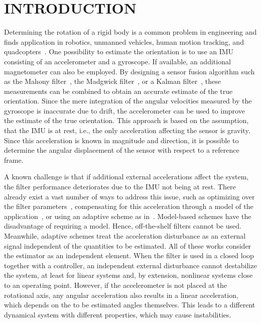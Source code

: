 
\section{INTRODUCTION}
Determining the rotation of a rigid body is a common problem in engineering and finds application in robotics, unmanned vehicles, human motion tracking, and quadcopters~\cite{Ludwig2018a, Nazarahari2021}.
One possibility to estimate the orientation is to use an \ac{IMU} consisting of an accelerometer and a gyroscope.
If available, an additional magnetometer can also be employed.
By designing a sensor fusion algorithm such as the Mahony filter~\cite{Mahony2008}, the Madgwick filter~\cite{Madgwick2011}, or a Kalman filter~\cite{Ludwig2018a}, these measurements can be combined to obtain an accurate estimate of the true orientation.
Since the mere integration of the angular velocities measured by the gyroscope is inaccurate due to drift, the accelerometer can be used to improve the estimate of the true orientation.
This approach is based on the assumption, that the \ac{IMU} is at rest, i.e., the only acceleration affecting the sensor is gravity.
Since this acceleration is known in magnitude and direction, it is possible to determine the angular displacement of the sensor with respect to a reference frame.

A known challenge is that if additional external accelerations affect the system, the filter performance deteriorates due to the \ac{IMU} not being at rest.
There already exist a vast number of ways to address this issue, such as optimizing over the filter parameters~\cite{Ludwig2018}, compensating for this acceleration through a model of the application~\cite{Ahmed2017, Briales2021}, or using  an adaptive scheme as in~\cite{Wei2025, Candan2021, Makni2016, Park2020}.
Model-based schemes have the disadvantage of requiring a model.
Hence, off-the-shelf filters cannot be used.
Meanwhile, adaptive schemes treat the acceleration disturbance as an external signal independent of the quantities to be estimated.
All of these works consider the estimator as an independent element.
When the filter is used in a closed loop together with a controller, an independent external disturbance cannot destabilize the system, at least for linear systems and, by extension, nonlinear systems close to an operating point.
However, if the accelerometer is not placed at the rotational axis, any angular acceleration also results in a linear acceleration, which depends on the to be estimated angles themselves.
This leads to a different dynamical system with different properties, which may cause instabilities.

